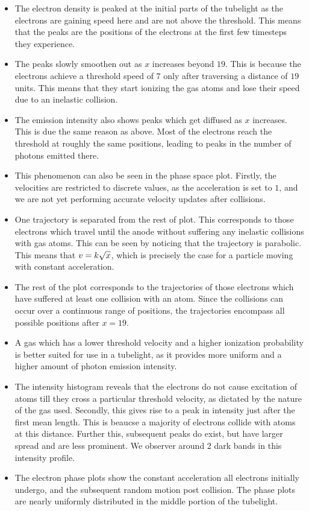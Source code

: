 \documentclass[11pt]{article}
\providecommand{\tightlist}{%
      \setlength{\itemsep}{0pt}\setlength{\parskip}{0pt}}
\begin{document}
\begin{itemize}
\tightlist
\item
  The electron density is peaked at the initial parts of the tubelight
  as the electrons are gaining speed here and are not above the
  threshold. This means that the peaks are the positions of the
  electrons at the first few timesteps they experience. 
\item
  The peaks slowly smoothen out as \(x\) increases beyond \(19\). This
  is because the electrons achieve a threshold speed of \(7\) only after
  traversing a distance of \(19\) units. This means that they start
  ionizing the gas atoms and lose their speed due to an inelastic
  collision. 
\item
  The emission intensity also shows peaks which get diffused as \(x\)
  increases. This is due the same reason as above. Most of the electrons
  reach the threshold at roughly the same positions, leading to peaks in
  the number of photons emitted there. 
\item
  This phenomenon can also be seen in the phase space plot. Firstly, the
  velocities are restricted to discrete values, as the acceleration is
  set to \(1\), and we are not yet performing accurate velocity updates
  after collisions. 
\item
  One trajectory is separated from the rest of plot. This corresponds to
  those electrons which travel until the anode without suffering any
  inelastic collisions with gas atoms. This can be seen by noticing that
  the trajectory is parabolic. This means that
  \(v \space = k \sqrt{x}\), which is precisely the case for a particle
  moving with constant acceleration. 
\item
  The rest of the plot corresponds to the trajectories of those
  electrons which have suffered at least one collision with an atom.
  Since the collisions can occur over a continuous range of positions,
  the trajectories encompass all possible positions after \(x=19\). 
\item
  A gas which has a lower threshold velocity and a higher ionization
  probability is better suited for use in a tubelight, as it provides
  more uniform and a higher amount of photon emission intensity. 
\item
  The intensity histogram reveals that the electrons do not cause
  excitation of atoms till they cross a particular threshold velocity,
  as dictated by the nature of the gas used. Secondly, this gives rise
  to a peak in intensity just after the first mean length. This is
  beaucse a majority of electrons collide with atoms at this distance.
  Further this, subsequent peaks do exist, but have larger spread and
  are less prominent. We observer around 2 dark bands in this intensity
  profile. 
\item
  The electron phase plots show the constant acceleration all electrons
  initially undergo, and the subsequent random motion post collision.
  The phase plots are nearly uniformly distributed in the middle portion
  of the tubelight.
\end{itemize}


    
    
    
\end{document}
